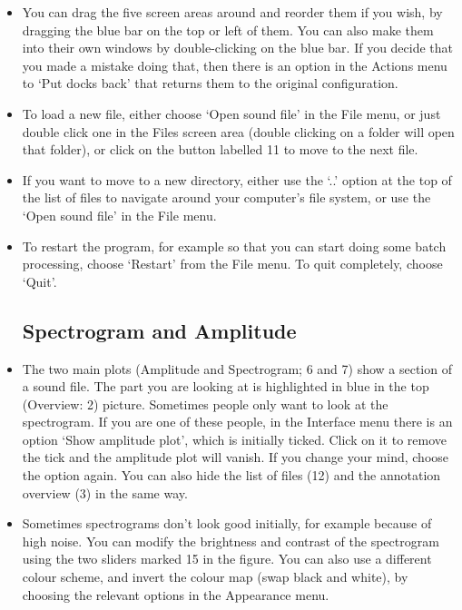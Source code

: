 \documentclass{article}
\begin{document}
\begin{itemize}
\item You can drag the five screen areas around and reorder them if you wish, by dragging the blue bar on the top or left of them. You can also make them into their own windows by double-clicking on the blue bar. If you decide that you made a mistake doing that, then there is an option in the Actions menu to `Put docks back' that returns them to the original configuration.

\item To load a new file, either choose `Open sound file' in the File menu, or just double click one in the Files screen area (double clicking on a folder will open that folder), or click on the button labelled 11 to move to the next file. 

\item If you want to move to a new directory, either use the `..' option at the top of the list of files to navigate around your computer's file system, or use the  `Open sound file' in the File menu.

\item To restart the program, for example so that you can start doing some batch processing, choose `Restart' from the File menu. To quit completely, choose `Quit'. 


\subsection{Spectrogram and Amplitude}

\item The two main plots (Amplitude and Spectrogram; 6 and 7) show a section of a sound file. The part you are looking at is highlighted in blue in the top (Overview: 2) picture. Sometimes people only want to look at the spectrogram. If you are one of these people, in the Interface menu there is an option `Show amplitude plot', which is initially ticked. Click on it to remove the tick and the amplitude plot will vanish. If you change your mind, choose the option again. You can also hide the list of files (12) and the annotation overview (3) in the same way. 

\item Sometimes spectrograms don't look good initially, for example because of high noise. You can modify the brightness and contrast of the spectrogram using the two sliders marked 15 in the figure. You can also use a different colour scheme, and invert the colour map (swap black and white), by choosing the relevant options in the Appearance menu. 


\end{itemize}
\end{document}
